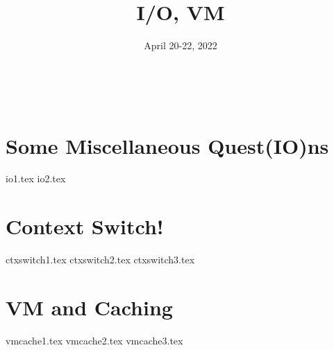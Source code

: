 \documentclass[11pt]{exam}
\title{I/O, VM}
\date{April 20-22, 2022}
\begin{document}
\maketitle
​
\section{Some Miscellaneous Quest(IO)ns}
\begin{questions}
{io1.tex}
{io2.tex}
\end{questions}
\newpage

\section{Context Switch!}
\begin{questions}
{ctxswitch1.tex}
{ctxswitch2.tex}
{ctxswitch3.tex}
\end{questions}
\newpage

\section{VM and Caching}
\begin{questions}
{vmcache1.tex}
{vmcache2.tex}
{vmcache3.tex}
\end{questions}


\end{document}
